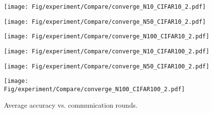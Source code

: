 \documentclass[sigconf]{acmart}
\begin{document}
\begin{figure*}[h]
\centering
\begin{minipage}[t]{0.3\linewidth}
\centering
\texttt{[image: Fig/experiment/Compare/converge\_N10\_CIFAR10\_2.pdf]}
\end{minipage}%
\begin{minipage}[t]{0.3\linewidth}
\centering
\texttt{[image: Fig/experiment/Compare/converge\_N50\_CIFAR10\_2.pdf]}
\end{minipage}%
\begin{minipage}[t]{0.3\linewidth}
\centering
\texttt{[image: Fig/experiment/Compare/converge\_N100\_CIFAR10\_2.pdf]}
\end{minipage}%

\begin{minipage}[t]{0.3\linewidth}
\centering
\texttt{[image: Fig/experiment/Compare/converge\_N10\_CIFAR100\_2.pdf]}
\end{minipage}%
\begin{minipage}[t]{0.3\linewidth}
\centering
\texttt{[image: Fig/experiment/Compare/converge\_N50\_CIFAR100\_2.pdf]}
\end{minipage}%
\begin{minipage}[t]{0.3\linewidth}
\centering
\texttt{[image: Fig/experiment/Compare/converge\_N100\_CIFAR100\_2.pdf]}
\end{minipage}%
\caption{Average accuracy vs. communication rounds.}
\label{fig:compare-hetero-converge}
\end{figure*}
\end{document}
